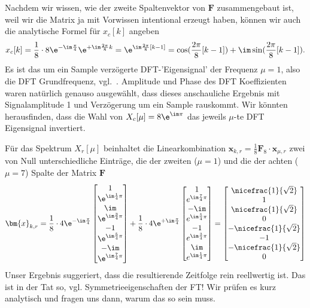 \begin{ExCalc}
%
Nachdem wir wissen, wie der zweite Spaltenvektor von $\bm{F}$ zusammengebaut
ist, weil wir die Matrix ja mit Vorwissen intentional erzeugt haben, können wir
auch die analytische Formel für $x_c[k]$ angeben
\begin{align}
x_c[k] = \frac{1}{8} \cdot 8 \e^{-\im\frac{\pi}{4}} \e^{+\im\frac{2\pi}{8} k}=
\e^{\im \frac{2\pi}{8} [k -1] } =
\cos(\frac{2\pi}{8} [k-1]) + \im \sin(\frac{2\pi}{8} [k-1]).
\end{align}
Es ist das um ein Sample verzögerte DFT-'Eigensignal' der Frequenz $\mu=1$, also
die DFT Grundfrequenz, vgl.~.
Amplitude und Phase des DFT Koeffizienten waren
natürlich genauso ausgewählt, dass dieses anschauliche Ergebnis mit
Signalamplitude 1 und Verzögerung um ein Sample rauskommt. Wir könnten
herausfinden, dass die Wahl von $X_c[\mu] = 8\e^{\im\pi}$ das jeweils $\mu$-te DFT Eigensignal
invertiert.

Für das Spektrum $X_r[\mu]$ beinhaltet die Linearkombination $\bm{x}_{k,r}  =
\frac{1}{8} \bm{F}_8 \cdot \bm{x}_{\mu,r}$ zwei von Null unterschiedliche
Einträge, die der zweiten ($\mu=1$) und die der achten ($\mu=7$)
Spalte der Matrix $\bm{F}$
\begin{align}
\bm{x}_{k,r} = \frac{1}{8} \cdot 4 \e^{-\im\frac{\pi}{4}}
\begin{bmatrix}
1 \\  \e^{\im\frac{1}{4}\pi} \\ \im \\ \e^{\im\frac{3}{4}\pi}  \\ -1 \\ \e^{\im\frac{5}{4}\pi} \\ -\im \\ \e^{\im\frac{7}{4}\pi}
\end{bmatrix}
+
\frac{1}{8} \cdot 4 \e^{+\im\frac{\pi}{4}}
\begin{bmatrix}
1 \\ e^{\im\frac{7}{4}\pi} \\ -\im \\ e^{\im\frac{5}{4}\pi} \\ -1 \\ e^{\im\frac{3}{4}\pi} \\ \im \\ e^{\im\frac{1}{4}\pi}
\end{bmatrix}
=
\begin{bmatrix}
\nicefrac{1}{\sqrt{2}}\\
1\\
\nicefrac{1}{\sqrt{2}}\\
0\\
-\nicefrac{1}{\sqrt{2}}\\
-1\\
-\nicefrac{1}{\sqrt{2}}\\
0
\end{bmatrix}
\end{align}
Unser Ergebnis suggeriert, dass die resultierende Zeitfolge rein reellwertig ist.
Das ist in der Tat so, vgl. Symmetrieeigenschaften der FT!
Wir prüfen es kurz analytisch und fragen uns dann, warum
das so sein muss.


\end{ExCalc}
